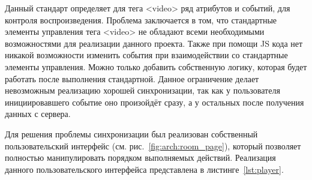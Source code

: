 Данный стандарт определяет для тега <video> ряд атрибутов и событий, для контроля воспроизведения.
Проблема заключается в том, что стандартные элементы управления тега <video> не обладают всеми необходимыми возможностями для реализации данного проекта.
Также при помощи JS кода нет никакой возможности изменить события при взаимодействии со стандартные элементы управления. 
Можно только добавить собственную логику, которая будет работать после выполнения стандартной.
Данное ограничение делает невозможным реализацию хорошей синхронизации, так как у пользователя инициировавшего событие оно произойдёт сразу, а у остальных после получения данных с сервера.

Для решения проблемы синхронизации был реализован собственный пользовательский интерфейс (см. рис.~\ref{fig:arch:room_page}), который позволяет полностью манипулировать порядком выполняемых действий. Реализация данного пользовательского интерфейса представлена в листинге~\ref{lst:player}.
